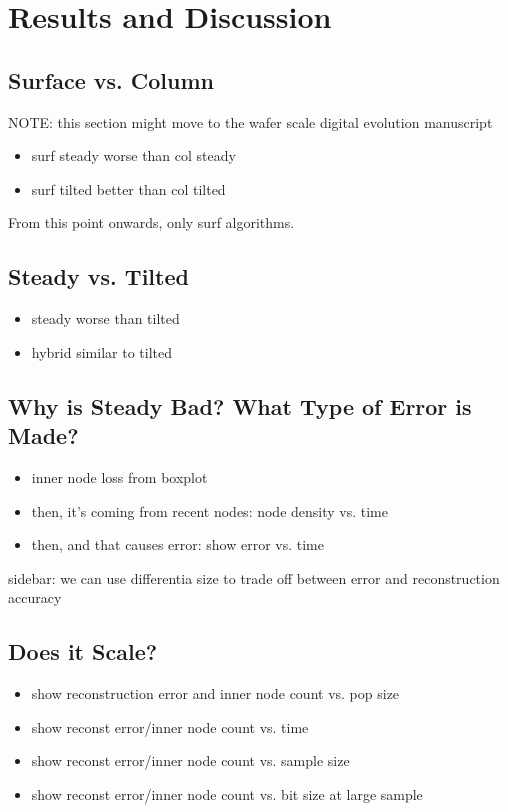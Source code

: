 \section{Results and Discussion} \label{sec:results}

\subsection{Surface vs. Column} \label{sec:surface-vs-column}
NOTE: this section might move to the wafer scale digital evolution manuscript

\begin{itemize}
    \item surf steady worse than col steady
    \item surf tilted better than col tilted
\end{itemize}

From this point onwards, only surf algorithms.

\subsection{Steady vs. Tilted} \label{sec:steady-vs-tilted}
\begin{itemize}
    \item steady worse than tilted
    \item hybrid similar to tilted
\end{itemize}

\subsection{Why is Steady Bad? What Type of Error is Made?} \label{sec:error-analysis}
\begin{itemize}
    \item inner node loss from boxplot
    \item then, it's coming from recent nodes: node density vs. time
    \item then, and that causes error: show error vs. time
\end{itemize}

sidebar: we can use differentia size to trade off between error and reconstruction accuracy

\subsection{Does it Scale?} \label{sec:scaling}
\begin{itemize}
    \item show reconstruction error and inner node count vs. pop size
    \item show reconst error/inner node count vs. time
    \item show reconst error/inner node count vs. sample size
    \item show reconst error/inner node count vs. bit size at large sample
\end{itemize}
